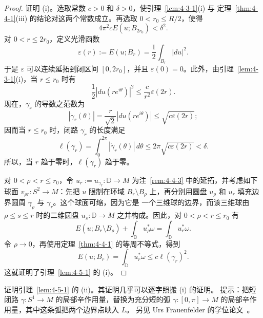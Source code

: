 \begin{proof}
证明 (i)。选取常数 $c>0$ 和 $\delta>0$，使引理~\ref{lem:4-3-1}(i) 与
定理~\ref{thm:4-4-1}(iii) 的结论对这两个常数成立。再选取
$0<r_0\le R/2$，使得
\[
  4\pi^2cE(u;B_{2r_0})<\delta^2.
\]
对 $0<r\le2r_0$，定义光滑函数
\[
  \varepsilon(r):=E(u;B_r)=\frac12\int_{B_r}|du|^2.
\]
于是 $\varepsilon$ 可以连续延拓到闭区间 $[0,2r_0]$，并且
$\varepsilon(0)=0$。此外，由引理~\ref{lem:4-3-1}(i)，当 $r\le r_0$ 时有
\[
  \frac12|du(re^{i\theta})|^2\le\frac c{r^2}\varepsilon(2r).
\]
现在，$\gamma_r$ 的导数之范数为
\[
  |\dot\gamma_r(\theta)|
  =\frac r{\sqrt2}|du(re^{i\theta})|
  \le\sqrt{c\varepsilon(2r)};
\]
因而当 $r\le r_0$ 时，闭路 $\gamma_r$ 的长度满足
\begin{equation}\label{eq:4-5-1}
  \ell(\gamma_r)
  =\int_0^{2\pi}|\dot\gamma_r(\theta)|\,d\theta
  \le2\pi\sqrt{c\varepsilon(2r)}<\delta.
\end{equation}
所以，当 $r$ 趋于零时，$\ell(\gamma_r)$ 趋于零。

对 $0<\rho<r\le r_0$，令
$u_r:=u_{\gamma_r}:\mathbb D\to M$ 为注~\ref{rem:4-4-3} 中的延拓，并考虑如下球面
$v_{\rho r}:S^2\to M$：先把 $u$ 限制在环域 $B_r\setminus B_\rho$ 上，再分别用圆盘
$u_\rho$ 和 $u_r$ 填充边界圆周 $\gamma_\rho$ 与 $\gamma_r$。这个球面可缩，因为它是
一个三维球的边界，而该三维球由 $\rho\le s\le r$ 时的二维圆盘
$u_s:\mathbb D\to M$ 之并构成。因此，对 $0<\rho<r\le r_0$ 有
\[
  E(u;B_r\setminus B_\rho)+\int_{\mathbb D}u_\rho^*\omega
  =\int_{\mathbb D}u_r^*\omega.
\]
令 $\rho\to0$，再使用定理~\ref{thm:4-4-1} 的等周不等式，得到
\[
  E(u;B_r)=\int_{\mathbb D}u_r^*\omega\le c\ell(\gamma_r)^2.
\]
这就证明了引理~\ref{lem:4-5-1} 的 (i)。
\end{proof}

\begin{exercise}\label{ex:4-5-2}
证明引理~\ref{lem:4-5-1} 的 (ii)。其证明几乎可以逐字照搬 (i) 的证明。
提示：把短闭路 $\gamma:S^1\to M$ 的局部辛作用量，替换为充分短的弧
$\gamma:[0,\pi]\to M$ 的局部辛作用量，其中这条弧把两个边界点映入 $L$。
另见 Urs Frauenfelder 的学位论文 \,。
\end{exercise}

